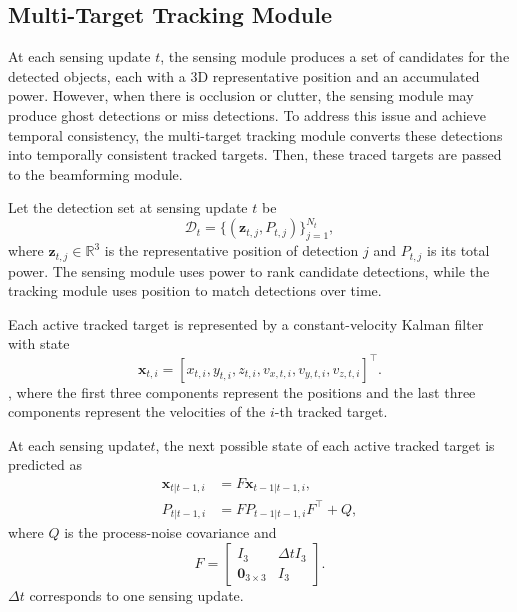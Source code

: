 \subsection{Multi-Target Tracking Module}
\label{subsec:tracking}

At each sensing update $t$, the sensing module produces a set of candidates for the detected objects, each with a 3D representative position and an accumulated power.
However, when there is occlusion or clutter, the sensing module may produce ghost detections or miss detections.
To address this issue and achieve temporal consistency, the multi-target tracking module converts these detections into temporally consistent tracked targets.
Then, these traced targets are passed to the beamforming module.

Let the detection set at sensing update $t$ be
\begin{equation}
    \mathcal{D}_t =
    \{(\mathbf{z}_{t,j}, P_{t,j})\}_{j=1}^{N_t},
\end{equation}
where $\mathbf{z}_{t,j}\in\mathbb{R}^{3}$ is the representative position of detection $j$ and $P_{t,j}$ is its total power.
The sensing module uses power to rank candidate detections, while the tracking module uses position to match detections over time.

Each active tracked target is represented by a constant-velocity Kalman filter with state
\begin{equation}
    \mathbf{x}_{t,i}
    =
    [x_{t,i}, y_{t,i}, z_{t,i},
    v_{x,t,i}, v_{y,t,i}, v_{z,t,i}]^{\!\top}.
\end{equation},
where the first three components represent the positions and the last three components represent the velocities of the $i$-th tracked target.

At each sensing update$t$, the next possible state of each active tracked target is predicted as
\begin{align}
    \mathbf{x}_{t|t-1,i} & = F\mathbf{x}_{t-1|t-1,i},        \\
    P_{t|t-1,i}          & = F P_{t-1|t-1,i} F^{\!\top} + Q,
\end{align}
where $Q$ is the process-noise covariance and
\begin{equation}
    F =
    \begin{bmatrix}
        I_3                    & \Delta t I_3 \\
        \mathbf{0}_{3\times 3} & I_3
    \end{bmatrix}.
\end{equation}
$\Delta t$ corresponds to one sensing update.

